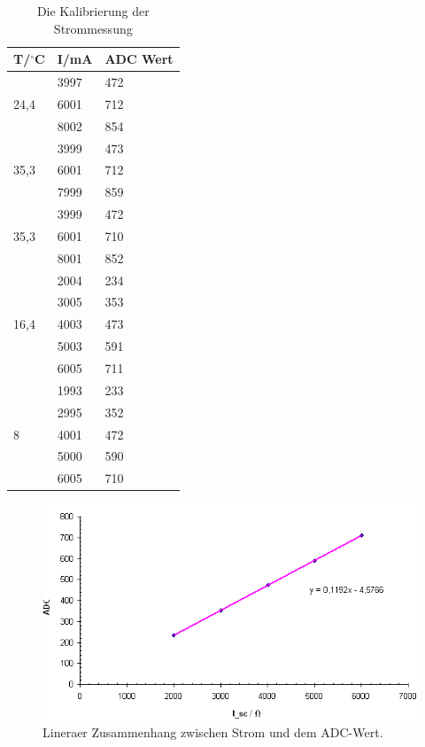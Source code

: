 \documentclass[a4paper,bibtotoc,oneside]{scrbook}
\begin{document}
\begin{table}[htbp]
\centering
\begin{tabular}{|l|l|l|}
\hline
T/$^{\circ}$C & I/mA & ADC Wert \\ 
\hline
\hline

\multirow{3}{*}{24,4} & 3997 & 472 \\
 & 6001 & 712 \\
 & 8002 & 854 \\ \hline
\multirow{3}{*}{35,3} & 3999 & 473 \\
 & 6001 & 712 \\
 & 7999 & 859 \\ \hline
\multirow{3}{*}{35,3} & 3999 & 472 \\
 & 6001 & 710 \\
 & 8001 & 852 \\ \hline
\multirow{5}{*}{16,4} & 2004 & 234 \\
 & 3005 & 353 \\
 & 4003 & 473 \\
 & 5003 & 591 \\
 & 6005 & 711 \\ \hline
\multirow{5}{*}{8} & 1993 & 233 \\
 & 2995 & 352 \\
 & 4001 & 472 \\
 & 5000 & 590 \\
 & 6005 & 710 \\ \hline
\end{tabular}
\caption{Die Kalibrierung der Strommessung}\label{TabS}
\end{table}

\begin{figure}[htbp]
\centering
\includegraphics[width=150mm]{img/16grad.png}
\caption{Lineraer Zusammenhang zwischen Strom und dem ADC-Wert.}\label{ical}
\end{figure}
\end{document}
